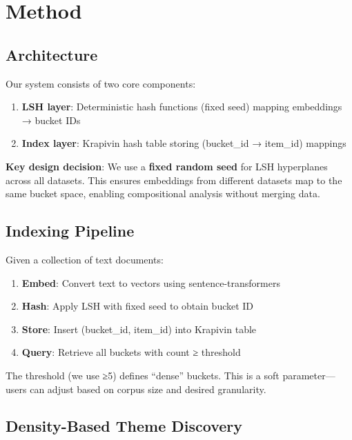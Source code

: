 \documentclass[
]{article}
\providecommand{\tightlist}{%
  \setlength{\itemsep}{0pt}\setlength{\parskip}{0pt}}
\begin{document}
\section{Method}\label{method}

\subsection{Architecture}\label{architecture}

Our system consists of two core components:

\begin{enumerate}
\def\labelenumi{\arabic{enumi}.}
\tightlist
\item
  \textbf{LSH layer}: Deterministic hash functions (fixed seed) mapping
  embeddings → bucket IDs
\item
  \textbf{Index layer}: Krapivin hash table storing (bucket\_id →
  item\_id) mappings
\end{enumerate}

\textbf{Key design decision}: We use a \textbf{fixed random seed} for
LSH hyperplanes across all datasets. This ensures embeddings from
different datasets map to the same bucket space, enabling compositional
analysis without merging data.

\subsection{Indexing Pipeline}\label{indexing-pipeline}

Given a collection of text documents:

\begin{enumerate}
\def\labelenumi{\arabic{enumi}.}
\tightlist
\item
  \textbf{Embed}: Convert text to vectors using sentence-transformers
\item
  \textbf{Hash}: Apply LSH with fixed seed to obtain bucket ID
\item
  \textbf{Store}: Insert (bucket\_id, item\_id) into Krapivin table
\item
  \textbf{Query}: Retrieve all buckets with count ≥ threshold
\end{enumerate}

The threshold (we use ≥5) defines ``dense'' buckets. This is a soft
parameter---users can adjust based on corpus size and desired
granularity.

\subsection{Density-Based Theme
Discovery}\label{density-based-theme-discovery}
\end{document}
